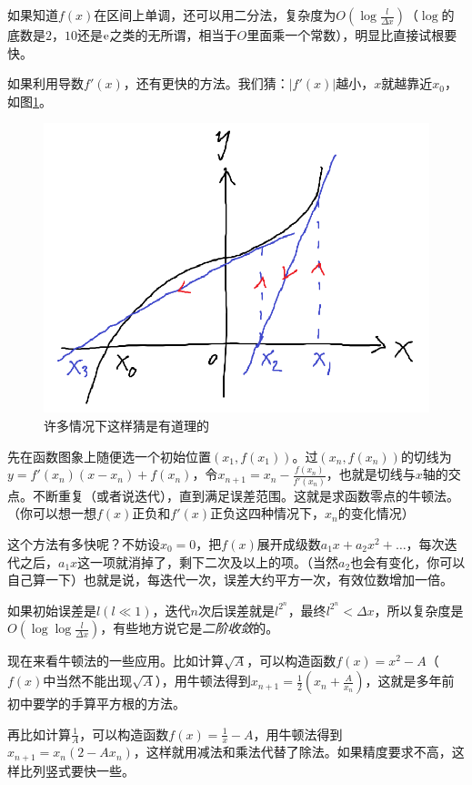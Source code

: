 如果知道$f(x)$在区间上单调，还可以用二分法，复杂度为$O(\log \frac{l}{\Delta x})$（$\log$的底数是$2$，$10$还是$\mathrm{e}$之类的无所谓，相当于$O$里面乘一个常数），明显比直接试根要快。

如果利用导数$f'(x)$，还有更快的方法。我们猜：$|f'(x)|$越小，$x$就越靠近$x_0$，如图\ref{fig-newton-iter}。
\begin{figure}[htb]
\centering
\includegraphics[scale=0.5]{fig/newton-iter}
\caption{许多情况下这样猜是有道理的}
\label{fig-newton-iter}
\end{figure}

先在函数图象上随便选一个初始位置$(x_1,f(x_1))$。过$(x_n,f(x_n))$的切线为$y=f'(x_n)(x-x_n)+f(x_n)$，令$x_{n+1}=x_n-\frac{f(x_n)}{f'(x_n)}$，也就是切线与$x$轴的交点。不断重复（或者说迭代），直到满足误差范围。这就是求函数零点的牛顿法。（你可以想一想$f(x)$正负和$f'(x)$正负这四种情况下，$x_n$的变化情况）

这个方法有多快呢？不妨设$x_0=0$，把$f(x)$展开成级数$a_1 x+a_2 x^2+\dots$，每次迭代之后，$a_1 x$这一项就消掉了，剩下二次及以上的项。（当然$a_2$也会有变化，你可以自己算一下）也就是说，每迭代一次，误差大约平方一次，有效位数增加一倍。

如果初始误差是$l(l \ll 1)$，迭代$n$次后误差就是$l^{2^n}$，最终$l^{2^n}<\Delta x$，所以复杂度是$O(\log \log \frac{l}{\Delta x})$，有些地方说它是\emph{二阶收敛}的。

现在来看牛顿法的一些应用。比如计算$\sqrt{A}$，可以构造函数$f(x)=x^2-A$（$f(x)$中当然不能出现$\sqrt{A}$），用牛顿法得到$x_{n+1}=\frac{1}{2}(x_n+\frac{A}{x_n})$，这就是多年前初中要学的手算平方根的方法。

再比如计算$\frac{1}{A}$，可以构造函数$f(x)=\frac{1}{x}-A$，用牛顿法得到$x_{n+1}=x_n(2-A x_n)$，这样就用减法和乘法代替了除法。如果精度要求不高，这样比列竖式要快一些。

